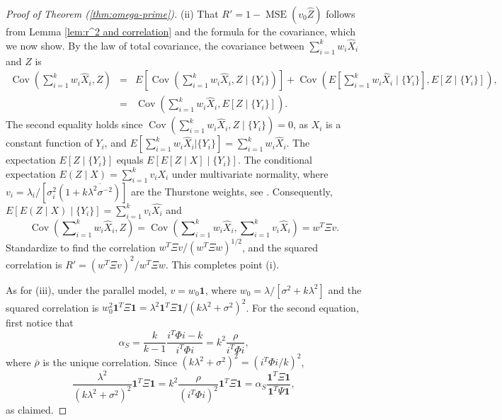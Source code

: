 \documentclass[twoside]{article}
\DeclareMathOperator{\Cov}{Cov}
\DeclareMathOperator{\MSE}{MSE}
\DeclareMathOperator{\tsum}{\textstyle \sum}
\renewcommand{\sqrt}[1]{{(#1)^{1/2}}}
\begin{document}
\begin{proof}[Proof of Theorem (\ref{thm:omega-prime})]
\label{proof:omega-prime}(ii) That $ R'=1-\MSE(v_{0}\hat{Z})$
follows from Lemma \ref{lem:r^2 and correlation} and the formula
for the covariance, which we now show. By the law of total covariance, the covariance between $\tsum_{i=1}^{k}w_{i}\hat{X}_{i}$
and $Z$ is
\begin{eqnarray*}
\Cov(\tsum_{i=1}^{k}w_{i}\hat{X}_{i},Z) & = & E[\Cov(\tsum_{i=1}^{k}w_{i}\hat{X}_{i},Z\mid\{Y_{i}\})]+\Cov(E[\tsum_{i=1}^{k}w_{i}\hat{X}_{i}\mid\{Y_{i}\}],E[Z\mid\{Y_{i}\}]),\\
 & = & \Cov(\tsum_{i=1}^{k}w_{i}\hat{X}_{i},E[Z\mid\{Y_{i}\}]).
\end{eqnarray*}
The second equality holds since $\Cov(\tsum_{i=1}^{k}w_{i}\hat{X}_{i},Z\mid\{Y_{i}\}) = 0$, as $X_i$ is a constant function of $Y_i$, and $E[\tsum_{i=1}^{k}w_{i}\hat{X}_{i}| \{Y_{i}\}] = \tsum_{i=1}^{k}w_{i}\hat{X}_{i}$.
The expectation $E[Z\mid\{Y_{i}\}]$ equals $E[E[Z\mid X]\mid\{Y_{i}\}]$.
The conditional expectation $E(Z\mid X)=\tsum_{i=1}^{k}v_{i}X_{i}$
under multivariate normality, where $v_{i}=\lambda_{i}/[\sigma_{i}^{2}(1+k\overline{\lambda^{2}\sigma^{-2}})]$
are the Thurstone weights, see \citet[Theorem 3.3.4]{Tong1990-lm}.
Consequently, $E[E(Z\mid X)\mid\{Y_{i}\}]=\tsum_{i=1}^{k}v_{i}\hat{X_{i}}$
and 
\begin{equation*}
\Cov(\tsum_{i=1}^{k}w_{i}\hat{X}_{i},Z) =  \Cov(\tsum_{i=1}^{k}w_{i}\hat{X}_{i},\tsum_{i=1}^{k}v_{i}\hat{X}_{i})=w^{T}\Xi v.
\end{equation*}
Standardize to find the correlation $w^{T}\Xi v/\sqrt{w^{T}\Xi w}$,
and the squared correlation is $ R'=(w^{T}\Xi v)^{2}/w^{T}\Xi w$.
This completes point (i). 

As for (iii), under the parallel model, $v=w_{0}\boldsymbol{1}$, where
$w_{0}=\lambda/[\sigma^{2}+k\lambda^{2}]$ and the squared correlation
is $w_{0}^{2}\boldsymbol{1}^{T}\Xi\boldsymbol{1}=\lambda^{2}\boldsymbol{1}^{T}\Xi\boldsymbol{1}/(k\lambda^{2}+\sigma^{2})^{2}$.
For the second equation, first notice that
\[
\alpha_S=\frac{k}{k-1}\frac{i^{T}\Phi i-k}{i^{T}\Phi i}=k^{2}\frac{\rho}{i^{T}\Phi i},
\]
where $\overline{\rho}$ is the unique correlation. Since $(k\lambda^{2}+\sigma^{2})^{2}=(i^{T}\Phi i/k)^{2}$, 
\begin{equation}
\frac{\lambda^{2}}{(k\lambda^{2}+\sigma^{2})^{2}}\boldsymbol{1}^{T}\Xi\boldsymbol{1} =  k^{2}\frac{\rho}{(i^{T}\Phi i)^{2}}\boldsymbol{1}^{T}\Xi\boldsymbol{1} =  \alpha_S\frac{\boldsymbol{1}^{T}\Xi\boldsymbol{1}}{\boldsymbol{1}^{T}\Psi\boldsymbol{1}},\nonumber
\end{equation}
as claimed.


\end{proof}
\end{document}
